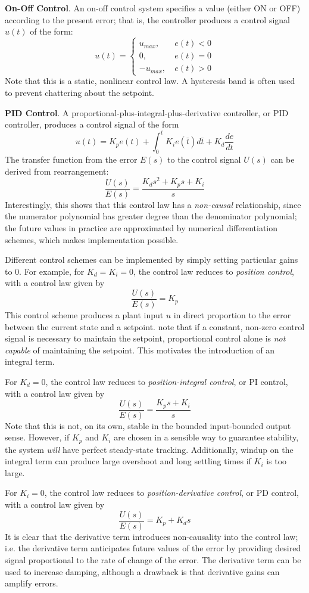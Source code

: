 \textbf{On-Off Control}. An on-off control system specifies a value (either ON or OFF) according to the present error; that is, the controller produces a control signal $u(t)$ of the form: \[u(t) = \begin{cases}
    u_{max},\ & e(t)<0\\
    0,\ & e(t)=0\\
    -u_{max},\ & e(t)>0
\end{cases}\] Note that this is a static, nonlinear control law. A hysteresis band is often used to prevent chattering about the setpoint.


\textbf{PID Control}. A proportional-plus-integral-plus-derivative controller, or PID controller, produces a control signal of the form \[u(t) = K_p e(t) + \int_0^t K_i e(\bar{t}) d\bar{t} + K_d \frac{de}{dt}\] The transfer function from the error $E(s)$ to the control signal $U(s)$ can be derived from rearrangement: \[\frac{U(s)}{E(s)} = \frac{K_ds^2 + K_ps + K_i}{s}\tag{PID Control}\] Interestingly, this shows that this control law has a \textit{non-causal} relationship, since the numerator polynomial has greater degree than the denominator polynomial; the future values in practice are approximated by numerical differentiation schemes, which makes implementation possible.

Different control schemes can be implemented by simply setting particular gains to $0$. For example, for $K_d=K_i=0$, the control law reduces to \textit{position control}, with a control law given by \[\frac{U(s)}{E(s)} = K_p\tag{P-Control}\] This control scheme produces a plant input $u$ in direct proportion to the error between the current state and a setpoint. note that if a constant, non-zero control signal is necessary to maintain the setpoint, proportional control alone is \textit{not capable} of maintaining the setpoint. This motivates the introduction of an integral term.

For $K_d=0$, the control law reduces to \textit{position-integral control}, or PI control, with a control law given by \[\frac{U(s)}{E(s)} = \frac{K_p s + K_i}{s} \tag{PI-Control}\] Note that this is not, on its own, stable in the bounded input-bounded output sense. However, if $K_p$ and $K_i$ are chosen in a sensible way to guarantee stability, the system \textit{will} have perfect steady-state tracking. Additionally, windup on the integral term can produce large overshoot and long settling times if $K_i$ is too large.

For $K_i = 0$, the control law reduces to \textit{position-derivative control}, or PD control, with a control law given by \[\frac{U(s)}{E(s)} = K_p + K_d s\tag{PD-Control}\] It is clear that the derivative term introduces non-causality into the control law; i.e. the derivative term anticipates future values of the error by providing desired signal proportional to the rate of change of the error. The derivative term can be used to increase damping, although a drawback is that derivative gains can amplify errors.

